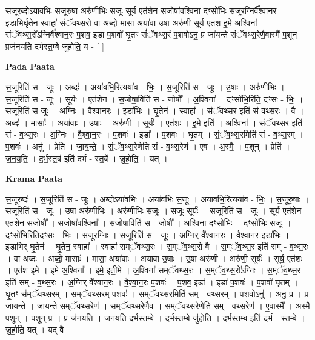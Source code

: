 \documentclass[17pt]{extarticle}
\begin{document}
स॒जूरब्दोऽया॑वभिः स॒जूरु॒षा अरु॑णीभिः स॒जूः सूर्य॒ एत॑शेन स॒जोषा॑व॒श्विना॒ दꣳसो॑भिः स॒जूर॒ग्निर्वै᳚श्वान॒र इडा॑भिर्घृ॒तेन॒ स्वाहा॑ संॅवथ्स॒रो वा अब्दो॒ मासा॒ अया॑वा उ॒षा अरु॑णी॒ सूर्य॒ एत॑श इ॒मे अ॒श्विना॑ संॅवथ्स॒रो᳚ऽग्निर्वै᳚श्वान॒रः प॒शव॒ इडा॑ प॒शवो॑ घृ॒तꣳ सं॑ॅवथ्स॒रं प॒शवोऽनु॒ प्र जा॑यन्ते संॅवथ्स॒रेणै॒वास्मै॑ प॒शून् प्रज॑नयति दर्भस्त॒म्बे जु॑होति॒ य - [  ] \newline

\textbf{Pada Paata} \newline

स॒जूरिति॑ स - जूः । अब्दः॑ । अया॑वभि॒रित्यया॑व - भिः॒ । स॒जूरिति॑ स - जूः । उ॒षाः । अरु॑णीभिः । स॒जूरिति॑ स - जूः । सूर्यः॑ । एत॑शेन । स॒जोषा॒विति॑ स - जोषौ᳚ । अ॒श्विना᳚ । दꣳसो॑भि॒रिति॒ दꣳसः॑ - भिः॒ । स॒जूरिति॑ स-जूः । अ॒ग्निः । वै॒श्वा॒न॒रः । इडा॑भिः । घृ॒तेन॑ । स्वाहा᳚ । सं॒ॅव॒थ्स॒र इति॑ सं-व॒थ्स॒रः । वै । अब्दः॑ । मासाः᳚ । अया॑वाः । उ॒षाः । अरु॑णी । सूर्यः॑ । एत॑शः । इ॒मे इति॑ । अ॒श्विना᳚ । सं॒ॅव॒थ्स॒र इति॑ सं - व॒थ्स॒रः । अ॒ग्निः । वै॒श्वा॒न॒रः । प॒शवः॑ । इडा᳚ । प॒शवः॑ । घृ॒तम् । सं॒ॅव॒थ्स॒रमिति॑ सं - व॒थ्स॒रम् । प॒शवः॑ । अनु॑ । प्रेति॑ । जा॒य॒न्ते॒ । सं॒ॅव॒थ्स॒रेणेति॑ सं - व॒थ्स॒रेण॑ । ए॒व । अ॒स्मै॒ । प॒शून् । प्रेति॑ । ज॒न॒य॒ति॒ । द॒र्भ॒स्त॒बं इति॑ दर्भ - स्त॒बें । जु॒हो॒ति॒ । यत् ।  \newline


\textbf{Krama Paata} \newline

स॒जूरब्दः॑ । स॒जूरिति॑ स - जूः । अब्दोऽया॑वभिः । अया॑वभिः स॒जूः । अया॑वभि॒रित्यया॑व - भिः॒ । स॒जूरु॒षाः । स॒जूरिति॑ स - जूः । उ॒षा अरु॑णीभिः । अरु॑णीभिः स॒जूः । स॒जूः सूर्यः॑ । स॒जूरिति॑ स - जूः । सूर्य॒ एत॑शेन । एत॑शेन स॒जोषौ᳚ । स॒जोषा॑व॒श्विना᳚ । स॒जोषा॒विति॑ स - जोषौ᳚ । अ॒श्विना॒ दꣳसो॑भिः । दꣳसो॑भिः स॒जूः । दꣳसो॑भि॒रिति॒दꣳसः॑ - भिः॒ । स॒जूर॒ग्निः । स॒जूरिति॑ स - जूः । अ॒ग्निर् वै᳚श्वान॒रः । वै॒श्वा॒न॒र इडा॑भिः । इडा॑भिर् घृ॒तेन॑ । घृ॒तेन॒ स्वाहा᳚ । स्वाहा॑ सम्ॅवथ्स॒रः । स॒म्ॅव॒थ्स॒रो वै । स॒म्ॅव॒थ्स॒र इति॑ सम् - व॒थ्स॒रः । वा अब्दः॑ । अब्दो॒ मासाः᳚ । मासा॒ अया॑वाः । अया॑वा उ॒षाः । उ॒षा अरु॑णी । अरु॑णी॒ सूर्यः॑ । सूर्य॒ एत॑शः । एत॑श इ॒मे । इ॒मे अ॒श्विना᳚ । इमे॒ इती॒मे । अ॒श्विना॑ सम्ॅवथ्स॒रः । स॒म्ॅव॒थ्स॒रो᳚ऽग्निः । स॒म्ॅव॒थ्स॒र इति॑ सम् - व॒थ्स॒रः । अ॒ग्निर् वै᳚श्वान॒रः । वै॒श्वा॒न॒रः प॒शवः॑ । प॒शव॒ इडा᳚ । इडा॑ प॒शवः॑ । प॒शवो॑ घृ॒तम् । घृ॒तꣳ स॑म्ॅवथ्स॒रम् । स॒म्ॅव॒थ्स॒रम् प॒शवः॑ । स॒म्ॅव॒थ्स॒रमिति॑ सम् - व॒थ्स॒रम् । प॒शवोऽनु॑ । अनु॒ प्र । प्र जा॑यन्ते । जा॒य॒न्ते॒ स॒म्ॅव॒थ्स॒रेण॑ । स॒म्ॅव॒थ्स॒रेणै॒व । स॒म्ॅव॒थ्स॒रेणेति॑ सम् - व॒थ्स॒रेण॑ । ए॒वास्मै᳚ । अ॒स्मै॒ प॒शून् । प॒शून् प्र । प्र ज॑नयति । ज॒न॒य॒ति॒ द॒र्भ॒स्त॒म्बे । द॒र्भ॒स्त॒म्बे जु॑होति । द॒र्भ॒स्त॒म्ब इति॑ दर्भ - स्त॒म्बे । जु॒हो॒ति॒ यत् । यद् वै \newline
\end{document}
